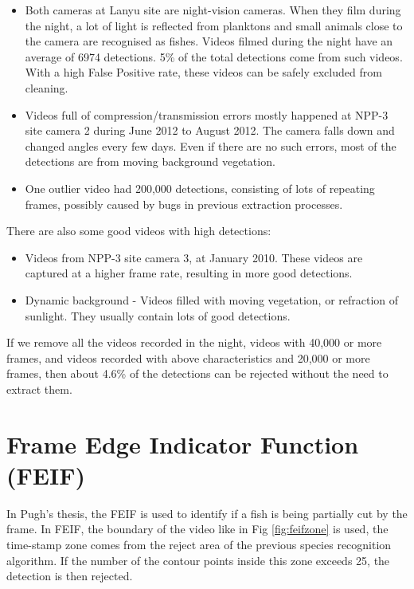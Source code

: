 \documentclass[bsc,logo,twoside,fullspacing,parskip]{infthesis}
\begin{document}
\begin{itemize}
\item
Both cameras at Lanyu site are night-vision cameras. When they film during the night, a lot of light is reflected from planktons and small animals close to the camera are recognised as fishes. Videos filmed during the night have an average of 6974 detections. 
5\% of the total detections come from such videos. 
With a high False Positive rate, these videos can be safely excluded from cleaning.
\item
Videos full of compression/transmission errors mostly happened at NPP-3 site camera 2 during June 2012 to August 2012. The camera falls down and changed angles every few days. Even if there are no such errors, most of the detections are from moving background vegetation.
\item
One outlier video had 200,000 detections, consisting of lots of repeating frames, possibly caused by bugs in previous extraction processes.
\end{itemize}
There are also some good videos with high detections: 
\begin{itemize}
\item
Videos from NPP-3 site camera 3, at January 2010. These videos are captured at a higher frame rate, resulting in more good detections.
\item
Dynamic background - Videos filled with moving vegetation, or refraction of sunlight. They usually contain lots of good detections.
\end{itemize}

If we remove all the videos recorded in the night, videos with 40,000 or more frames, and videos recorded with above characteristics and 20,000 or more frames, then about 4.6\% of the detections can be rejected without the need to extract them.

\section{Frame Edge Indicator Function (FEIF)}

In Pugh's thesis\cite{Pugh}, the FEIF is used to identify if a fish is being partially cut by the frame. 
In FEIF, the boundary of the video like in Fig \ref{fig:feifzone} is used, the time-stamp zone comes from the reject area of the previous species recognition algorithm. 
If the number of the contour points inside this zone exceeds 25, the detection is then rejected.
\end{document}
